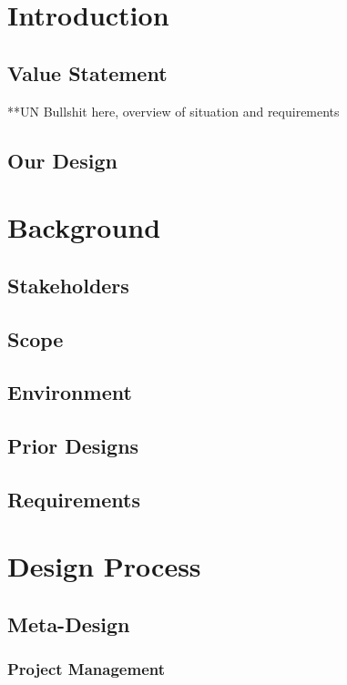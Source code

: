 \documentclass[11pt]{article}
\begin{document}
    \newpage
\begin{multicols*}{2}
    

    \section{Introduction}
        \subsection{Value Statement}
        **UN Bullshit here, overview of situation and requirements 
        \subsection{Our Design}

    \section{Background}
        \subsection{Stakeholders}

        \subsection{Scope}

        \subsection{Environment}

        \subsection{Prior Designs}

        \subsection{Requirements}

    \section{Design Process}
        \subsection{Meta-Design}
            \subsubsection{Project Management}
            

\end{multicols*}
\end{document}
